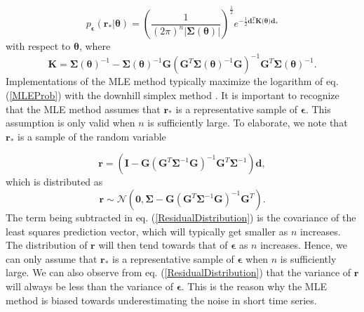 \documentclass[10pt,a4paper]{article}
\begin{document}
\begin{equation}\label{MLEProb}
p_\mathbf{\epsilon}(\mathbf{r}_*|\mathbf{\theta}) = 
\left(\frac{1}{(2\pi)^n\left| \mathbf{\Sigma}(\mathbf{\theta}) \right|}\right)^{\frac{1}{2}} 
e^{-\tfrac{1}{2}\mathbf{d}_*^T\mathbf{K(\mathbf{\theta}})\mathbf{d}_*}
\end{equation}
with respect to $\mathbf{\theta}$, where
\begin{equation}
\mathbf{K} = \mathbf{\Sigma}(\mathbf{\theta})^{-1} - 
             \mathbf{\Sigma}(\mathbf{\theta})^{-1}\mathbf{G}
             \left(\mathbf{G}^T\mathbf{\Sigma}(\mathbf{\theta})^{-1}\mathbf{G}\right)^{-1}
             \mathbf{G}^T\mathbf{\Sigma}(\mathbf{\theta})^{-1}.
\end{equation}
Implementations of the MLE method typically maximize the logarithm of eq. (\ref{MLEProb}) with the downhill simplex method \citep{Press2007}. It is important to recognize that the MLE method assumes that $\mathbf{r}_*$ is a representative sample of $\mathbf{\epsilon}$. This assumption is only valid when $n$ is sufficiently large. To elaborate, we note that $\mathbf{r_*}$ is a sample of the random variable

\begin{equation}\label{ResidualVariable}
  \mathbf{r} =  \left(\mathbf{I} - \mathbf{G}\left(\mathbf{G}^T\mathbf{\Sigma}^{-1}\mathbf{G}\right)^{-1}\mathbf{G}^T\mathbf{\Sigma}^{-1}\right)\mathbf{d},
\end{equation}  
which is distributed as
\begin{equation}\label{ResidualDistribution}
  \mathbf{r} \sim \mathcal{N}\left(\mathbf{0},\mathbf{\Sigma} - \mathbf{G}\left(\mathbf{G}^T\mathbf{\Sigma}^{-1}\mathbf{G}\right)^{-1}\mathbf{G}^T\right).
\end{equation}
The term being subtracted in eq. (\ref{ResidualDistribution}) is the covariance of the least squares prediction vector, which will typically get smaller as $n$ increases. The distribution of $\mathbf{r}$ will then tend towards that of $\mathbf{\epsilon}$ as $n$ increases. Hence, we can only assume that $\mathbf{r}_*$ is a representative sample of $\mathbf{\epsilon}$ when $n$ is sufficiently large. We can also observe from eq. (\ref{ResidualDistribution}) that the variance of $\mathbf{r}$ will always be less than the variance of $\mathbf{\epsilon}$. This is the reason why the MLE method is biased towards underestimating the noise in short time series.
\end{document}
